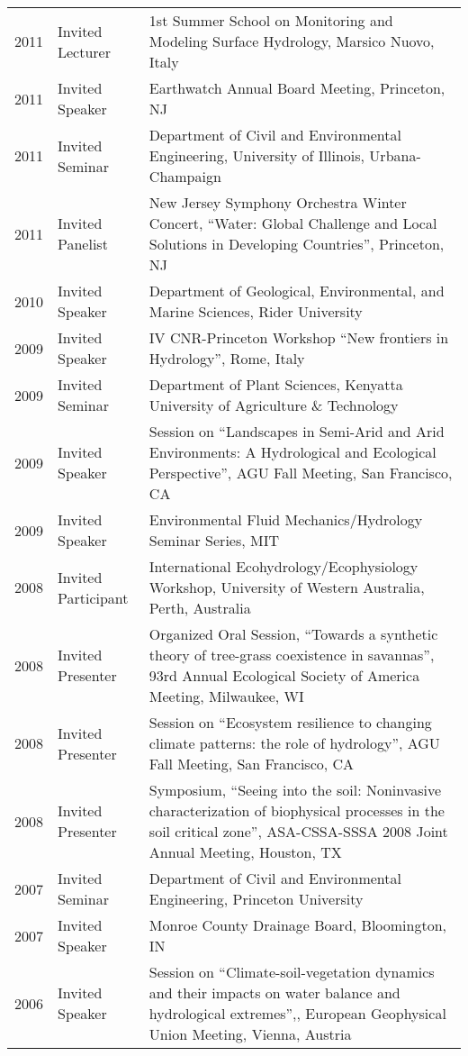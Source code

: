 \begin{longtable}{l p{3.0cm} p{11.5cm}}
2011 & Invited Lecturer & 1st Summer School on Monitoring and Modeling Surface Hydrology, Marsico Nuovo, Italy \\
2011 & Invited Speaker & Earthwatch Annual Board Meeting, Princeton, NJ \\
2011 & Invited Seminar & Department of Civil and Environmental Engineering, University of Illinois, Urbana-Champaign \\
2011 & Invited Panelist & New Jersey Symphony Orchestra Winter Concert, ``Water: Global Challenge and Local Solutions in Developing Countries'', Princeton, NJ \\
2010 & Invited Speaker & Department of Geological, Environmental, and Marine Sciences, Rider University \\
2009 & Invited Speaker & IV CNR-Princeton Workshop ``New frontiers in Hydrology'', Rome, Italy \\
2009 & Invited Seminar & Department of Plant Sciences, Kenyatta University of Agriculture \& Technology \\
2009 & Invited Speaker & Session on ``Landscapes in Semi-Arid and Arid Environments: A Hydrological and Ecological Perspective'', AGU Fall Meeting, San Francisco, CA \\
2009 & Invited Speaker & Environmental Fluid Mechanics/Hydrology Seminar Series, MIT  \\
2008 & Invited Participant & International Ecohydrology/Ecophysiology Workshop, University of Western Australia, Perth, Australia \\
2008 & Invited Presenter & Organized Oral Session, ``Towards a synthetic theory of tree-grass coexistence in savannas'', 93rd Annual Ecological Society of America Meeting, Milwaukee, WI \\
2008 & Invited Presenter & Session on ``Ecosystem resilience to changing climate patterns: the role of hydrology'', AGU Fall Meeting, San Francisco, CA \\
2008 & Invited Presenter & Symposium, ``Seeing into the soil: Noninvasive characterization of biophysical processes in the soil critical zone'', ASA-CSSA-SSSA 2008 Joint Annual Meeting, Houston, TX \\
2007 & Invited Seminar & Department of Civil and Environmental Engineering, Princeton University \\
2007 & Invited Speaker & Monroe County Drainage Board, Bloomington, IN \\
2006 & Invited Speaker & Session on ``Climate-soil-vegetation dynamics and their impacts on water balance and hydrological extremes'',, European Geophysical Union Meeting, Vienna, Austria \\

\end{longtable}
